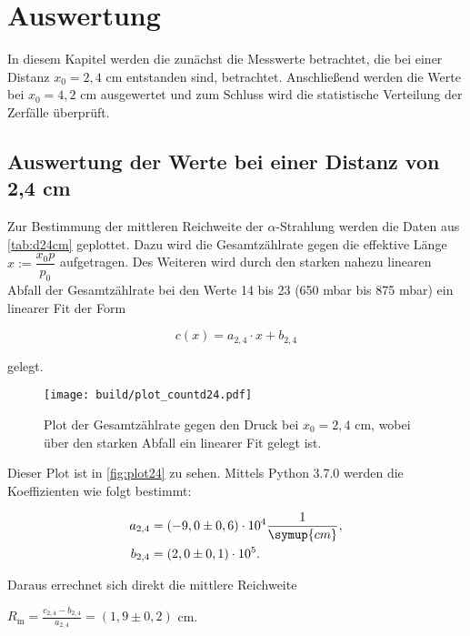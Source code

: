 \section{Auswertung}
\label{sec:Auswertung}

In diesem Kapitel werden die zunächst die Messwerte betrachtet, die bei einer Distanz $x_0 = 2,4$ cm entstanden sind, betrachtet.
Anschließend werden die Werte bei $x_0 = 4,2$ cm ausgewertet und zum Schluss wird die statistische Verteilung der Zerfälle überprüft.

\subsection{Auswertung der Werte bei einer Distanz von 2,4 cm}

Zur Bestimmung der mittleren Reichweite der $\alpha$-Strahlung werden die Daten aus \autoref{tab:d24cm} geplottet.
Dazu wird die Gesamtzählrate gegen die effektive Länge $x := \dfrac{x_0 p}{p_0}$ aufgetragen.
Des Weiteren wird durch den starken nahezu linearen Abfall der Gesamtzählrate bei den Werte 14 bis 23 (650 mbar bis 875 mbar) ein linearer Fit der Form

\begin{equation}
    c(x) = a_{2,4} \cdot x + b_{2,4}
\end{equation}

gelegt.



\begin{figure}
    \centering
    \texttt{[image: build/plot\_countd24.pdf]}
    \caption{Plot der Gesamtzählrate gegen den Druck bei $x_0 = 2,4$ cm, wobei über den starken Abfall ein linearer Fit gelegt ist.}
    \label{fig:plot24}
\end{figure}

Dieser Plot ist in \autoref{fig:plot24} zu sehen.
Mittels Python 3.7.0 werden die Koeffizienten wie folgt bestimmt:

\begin{align}
    a_{2,4} &= (-9,0 \pm 0,6) \cdot 10^{4} \frac{1}{\symup{cm}},\\
    b_{2,4} &= (2,0 \pm 0,1) \cdot 10^{5}.
\end{align}

Daraus errechnet sich direkt die mittlere Reichweite 

\begin{center}
    $R_\text{m} = \frac{c_{2,4} - b_{2,4}}{a_{2,4}} = (1,9 \pm 0,2)$ cm.
\end{center}


